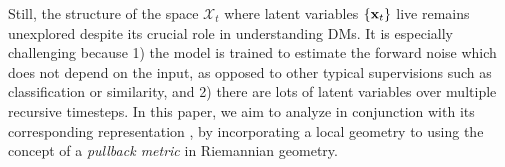 
Still, the structure of the space $\mathcal{X}_t$ where latent variables $\{\mathbf{x}_t\}$ live remains unexplored despite its crucial role in understanding DMs. It is especially challenging because 1) the model is trained to estimate the forward noise which does not depend on the input, as opposed to other typical supervisions such as classification or similarity, and 2) there are lots of latent variables over multiple recursive timesteps.
In this paper, we aim to analyze \exspace{} in conjunction with its corresponding representation \ehspace{}, by incorporating a local geometry to \exspace{} using the concept of a {\it pullback metric} in Riemannian geometry. 

